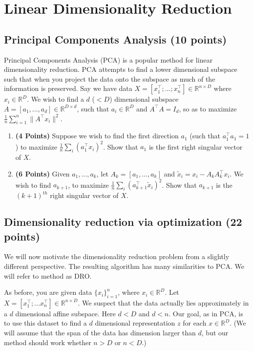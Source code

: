 \documentclass[a4paper]{article}
\newcounter{thm}
\theoremstyle{definition}
\newcommand{\RR}{\mathbb{R}}
\begin{document}
\pagebreak

\section{Linear Dimensionality Reduction}

\subsection{Principal Components Analysis  (10 points)}
\label{sec:pca}

Principal Components Analysis (PCA) is a popular method for linear dimensionality reduction. PCA attempts to find a lower dimensional subspace such that when you project the data onto the subspace as much of the information is preserved. Say we have data $X = [x_1^\top; \dots; x_n^\top] \in \RR^{n\times D}$ where  $x_i \in \RR^D$. We wish to find a $d$ ($ < D$) dimensional subspace $A = [a_1, \dots, a_d] \in \RR^{D\times d}$, such that $ a_i \in \RR^D$ and $A^\top A = I_d$, so as to maximize $\frac{1}{n} \sum_{i=1}^n \|A^\top x_i\|^2$.
\begin{enumerate}

	\item  \textbf{(4 Points)}
	      Suppose we wish to find the first direction $a_1$ (such that $a_1^\top a_1 = 1$) to maximize $\frac{1}{n} \sum_i (a_1^\top x_i)^2$.
	      Show that $a_1$ is the first right singular vector of $X$.

	\item  \textbf{(6 Points)}
	      Given $a_1, \dots, a_k$, let $A_k = [a_1, \dots, a_k]$ and
	      $\tilde{x}_i = x_i - A_kA_k^\top x_i$. We wish to find $a_{k+1}$, to maximize
	      $\frac{1}{n} \sum_i (a_{k+1}^\top \tilde{x}_i)^2$. Show that $a_{k+1}$ is the
	      $(k+1)^{th}$ right singular vector of $X$.


\end{enumerate}


\subsection{Dimensionality reduction via optimization (22 points)}

We will now motivate the dimensionality reduction problem from a slightly different
perspective. The resulting algorithm has many similarities to PCA.
We will refer to method as DRO.

As before, you are given data $\{x_i\}_{i=1}^n$, where $x_i \in \RR^D$. Let $X=[x_1^\top; \dots
	x_n^\top] \in \RR^{n\times D}$. We suspect that the data
actually lies approximately in  a $d$ dimensional affine subspace.
Here $d<D$ and $d<n$.
Our goal, as in PCA, is to use this dataset to find a $d$ dimensional representation $z$ for each $x\in\RR^D$.
(We will assume that the span of the data has dimension larger than
$d$, but our method should work whether $n>D$ or $n<D$.)
\end{document}
